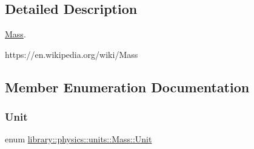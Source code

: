 \subsection{Detailed Description}
\hyperlink{classlibrary_1_1physics_1_1units_1_1_mass}{Mass}. 

https\+://en.wikipedia.\+org/wiki/\+Mass 

\subsection{Member Enumeration Documentation}
\mbox{\label{classlibrary_1_1physics_1_1units_1_1_mass_a95f1e0434bc16794926b8e273bc2a54b}} 
\subsubsection{\texorpdfstring{Unit}{Unit}}
{\footnotesize\ttfamily enum \hyperlink{classlibrary_1_1physics_1_1units_1_1_mass_a95f1e0434bc16794926b8e273bc2a54b}{library\+::physics\+::units\+::\+Mass\+::\+Unit}\hspace{0.3cm}{\ttfamily [strong]}}

